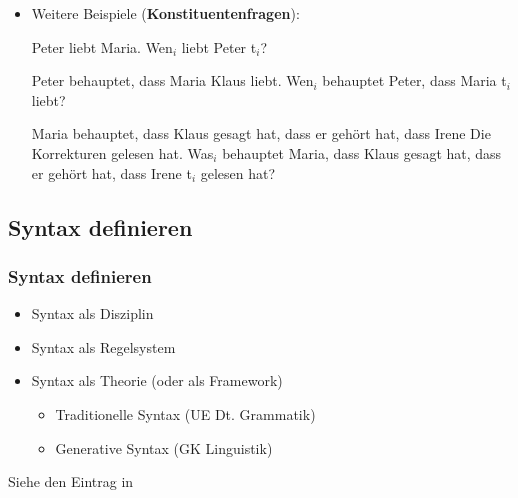\begin{frame}

\begin{itemize}

	\item Weitere Beispiele (\textbf{Konstituentenfragen}):

	\eal
	\ex Peter liebt \alert{Maria}.
	\ex \alert{Wen$_i$} liebt Peter t$_i$?
	\zl

\pause

	\eal 
	\ex Peter behauptet, dass Maria \alert{Klaus} liebt. 
	\ex \alert{Wen$_i$} behauptet Peter, dass Maria t$_i$ liebt? 
	\zl

\pause

	\eal
	\zl

\pause

	\eal 
	\ex Maria behauptet, dass Klaus gesagt hat, dass er gehört hat, 	dass Irene \alert{Die Korrekturen} gelesen hat. 
	\ex \alert{Was$_i$} behauptet Maria, dass Klaus gesagt hat, dass er gehört hat, dass Irene t$_i$ gelesen hat?
	\zl

\end{itemize}

\end{frame}


\subsection{Syntax definieren}


\begin{frame}
\frametitle{Syntax definieren}

\begin{itemize}
	\item Syntax als Disziplin
	\item Syntax als Regelsystem
	\item Syntax als Theorie (oder als Framework)
	\begin{itemize}
		\item Traditionelle Syntax (\ras UE Dt. Grammatik)
		\item Generative Syntax (\ras GK Linguistik)
	\end{itemize}
\end{itemize}

Siehe den Eintrag  in \citep{Glueck05a}

\end{frame}


